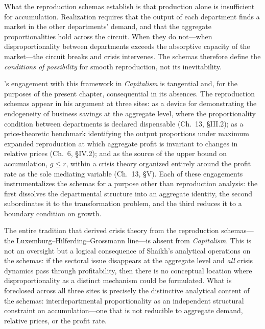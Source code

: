 \documentclass[11pt,a4paper]{article}
\begin{document}
What the reproduction schemas establish is that production alone is insufficient for accumulation. Realization requires that the output of each department finds a market in the other departments' demand, and that the aggregate proportionalities hold across the circuit. When they do not---when disproportionality between departments exceeds the absorptive capacity of the market---the circuit breaks and crisis intervenes. The schemas therefore define the \textit{conditions of possibility} for smooth reproduction, not its inevitability.

\citet{Shaikh2016}'s engagement with this framework in \emph{Capitalism} is tangential and, for the purposes of the present chapter, consequential in its absences. The reproduction schemas appear in his argument at three sites: as a device for demonstrating the endogeneity of business savings at the aggregate level, where the proportionality condition between departments is declared dispensable (Ch.~13, \S III.2); as a price-theoretic benchmark identifying the output proportions under maximum expanded reproduction at which aggregate profit is invariant to changes in relative prices (Ch.~6, \S IV.2); and as the source of the upper bound on accumulation, $g \leq r$, within a crisis theory organized entirely around the profit rate as the sole mediating variable (Ch.~13, \S V). Each of these engagements instrumentalizes the schemas for a purpose other than reproduction analysis: the first dissolves the departmental structure into an aggregate identity, the second subordinates it to the transformation problem, and the third reduces it to a boundary condition on growth.

The entire tradition that derived crisis theory from the reproduction schemas---the Luxemburg--Hilferding--Grossmann line---is absent from \emph{Capitalism}. This is not an oversight but a logical consequence of Shaikh's analytical operations on the schemas: if the sectoral issue disappears at the aggregate level and \emph{all} crisis dynamics pass through profitability, then there is no conceptual location where disproportionality as a distinct mechanism could be formulated. What is foreclosed across all three sites is precisely the distinctive analytical content of the schemas: interdepartmental proportionality as an independent structural constraint on accumulation---one that is not reducible to aggregate demand, relative prices, or the profit rate.
\end{document}
